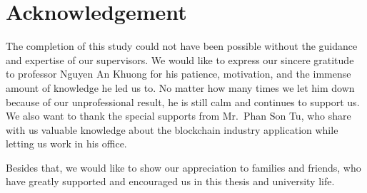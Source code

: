 \chapter*{Acknowledgement}
\thispagestyle{empty}
\label{Acknowledgement}
\hspace*{5cm}

The completion of this study could not have been possible without the guidance and expertise of our supervisors. We would like to express our sincere gratitude to professor Nguyen An Khuong for his patience, motivation, and the immense amount of knowledge he led us to. No matter how many times we let him down because of our unprofessional result, he is still calm and continues to support us. We also want to thank the special supports from Mr.~Phan Son Tu, who share with us valuable knowledge about the blockchain industry application while letting us work in his office.

Besides that, we would like to show our appreciation to families and friends, who have greatly supported and encouraged us in this thesis and university life.

\cleardoublepage